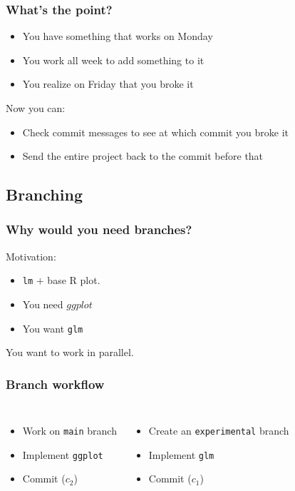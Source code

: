 \documentclass{beamer}
\begin{document}
\begin{frame}
    \frametitle{What's the point?}
    \begin{itemize}
        \item You have something that works on Monday
        \item You work all week to add something to it
        \item You realize on Friday that you broke it
    \end{itemize}
    Now you can: 
    \begin{itemize}
        \item Check commit messages to see at which commit you broke it
        \item Send the entire project back to the commit before that
    \end{itemize}
\end{frame} 

\subsection{Branching}
\begin{frame}[fragile]
    \frametitle{Why would you need branches?}
    Motivation:
    \begin{itemize}
        \item \verb|lm| $+$ base R plot. 
        \item You need $ggplot$
        \item You want \verb|glm|
    \end{itemize}
    You want to work in parallel. 
\end{frame}

\begin{frame}[fragile]
    \frametitle{Branch workflow}
    \begin{columns}
        
    \begin{itemize}
        \item Work on \verb|main| branch
        \item Implement \verb|ggplot|
        \item Commit ($c_2$)
    \end{itemize}
    \begin{itemize}
        \item Create an \verb|experimental| branch
        \item Implement \verb|glm|
        \item Commit ($c_1$)
    \end{itemize}
\end{columns}
\end{frame}
\end{document}
